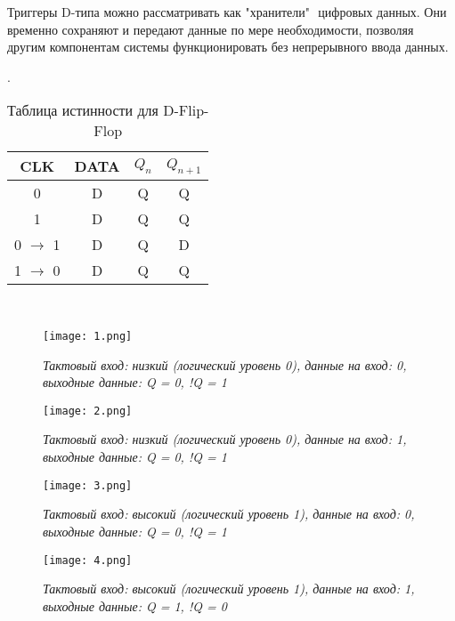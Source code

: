 \documentclass[a4paper,12pt]{article}
\begin{document}
\newline
Триггеры D-типа можно рассматривать как "хранители" $ $ цифровых данных. Они временно сохраняют и передают данные по мере необходимости, позволяя другим компонентам системы функционировать без непрерывного ввода данных.

. 
\begin{table}[H]
\centering
\begin{tabular}{|c|c|c|c|}
\hline
CLK & DATA & $Q_{n}$ & $Q_{n+1}$ \\ \hline
0   & D   &  Q  & Q \\ \hline
1   & D   &  Q  & Q    \\ \hline
0 $\rightarrow$ 1   & D & Q & D \\ \hline
1 $\rightarrow$ 0   & D & Q & Q \\ \hline
\end{tabular}
\caption{Таблица истинности для D-Flip-Flop}
\end{table}\\



\begin{figure}[H]
	\begin{center}
		\texttt{[image: 1.png]}
	\end{center}
	\caption{\textit{Тактовый вход: низкий (логический уровень 0), данные на вход: 0, выходные данные: Q = 0, !Q = 1}}
	\label{ust}
        \end{figure}

\begin{figure}[H]
	\begin{center}
		\texttt{[image: 2.png]}
	\end{center}
	\caption{\textit{Тактовый вход: низкий (логический уровень 0), данные на вход: 1, выходные данные: Q = 0, !Q = 1}}
	\label{ust}
        \end{figure}

\begin{figure}[H]
	\begin{center}
		\texttt{[image: 3.png]}
	\end{center}
	\caption{\textit{Тактовый вход: высокий (логический уровень 1), данные на вход: 0, выходные данные: Q = 0, !Q = 1}}
	\label{ust}
        \end{figure}

\begin{figure}[H]
	\begin{center}
		\texttt{[image: 4.png]}
	\end{center}
	\caption{\textit{Тактовый вход: высокий (логический уровень 1), данные на вход: 1, выходные данные: Q = 1, !Q = 0}}
	\label{ust}
        \end{figure}
\end{document}
